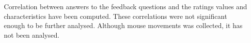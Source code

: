 Correlation between answers to the feedback questions and the ratings values and characteristics have been computed. These correlations were not significant enough to be further analysed. Although mouse movements was collected, it has not been analysed.